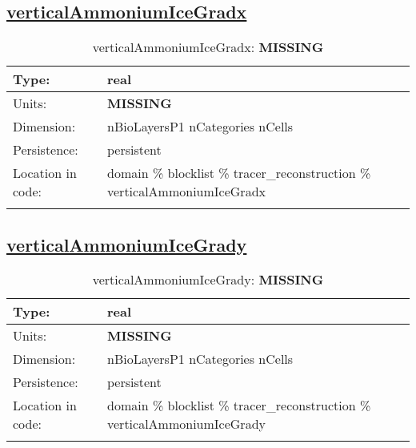 \subsection[verticalAmmoniumIceGradx]{\hyperref[sec:var_tab_tracer_reconstruction]{verticalAmmoniumIceGradx}}
\label{subsec:var_sec_tracer_reconstruction_verticalAmmoniumIceGradx}
\begin{center}
\begin{longtable}{| p{2.0in} | p{4.0in} |}
        \hline 
        Type: & real \\
        \hline 
        Units: & {\bf \color{red} MISSING} \\
        \hline 
        Dimension: & nBioLayersP1 nCategories nCells \\
        \hline 
        Persistence: & persistent \\
        \hline 
         Location in code: & domain \% blocklist \% tracer\_reconstruction \% verticalAmmoniumIceGradx \\
         \hline 
    \caption{verticalAmmoniumIceGradx: {\bf \color{red} MISSING}}
\end{longtable}
\end{center}
\subsection[verticalAmmoniumIceGrady]{\hyperref[sec:var_tab_tracer_reconstruction]{verticalAmmoniumIceGrady}}
\label{subsec:var_sec_tracer_reconstruction_verticalAmmoniumIceGrady}
\begin{center}
\begin{longtable}{| p{2.0in} | p{4.0in} |}
        \hline 
        Type: & real \\
        \hline 
        Units: & {\bf \color{red} MISSING} \\
        \hline 
        Dimension: & nBioLayersP1 nCategories nCells \\
        \hline 
        Persistence: & persistent \\
        \hline 
         Location in code: & domain \% blocklist \% tracer\_reconstruction \% verticalAmmoniumIceGrady \\
         \hline 
    \caption{verticalAmmoniumIceGrady: {\bf \color{red} MISSING}}
\end{longtable}
\end{center}
